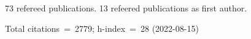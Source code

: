 73 refereed publications. 13 refeered publications as first author.

Total citations~=~2779; h-index~=~28 (2022-08-15)